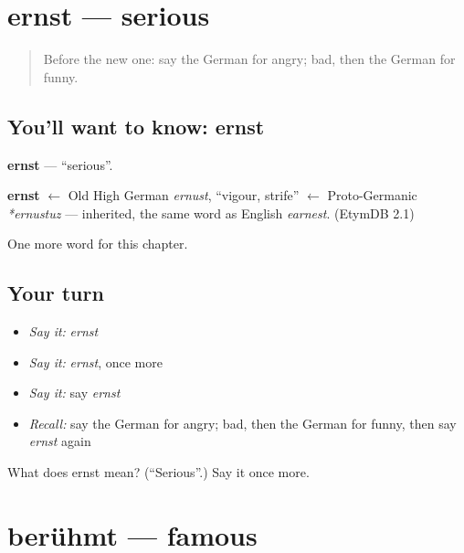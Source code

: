 \section[ernst]{ernst — serious}

\label{lesson:GE-C133-ernst}



\begin{quote}
Before the new one: say the German for angry; bad, then the German for funny.
\end{quote}

\subsection*{You'll want to know: ernst}
\textbf{ernst} — \textquotedblleft{}serious\textquotedblright{}.

\begin{cousinweb}
\textbf{ernst} $\leftarrow$ Old High German \emph{ernust}, \textquotedblleft{}vigour, strife\textquotedblright{} $\leftarrow$ Proto-Germanic \emph{*ernustuz} — inherited, the same word as English \emph{earnest}. (EtymDB 2.1)
\end{cousinweb}

\begin{grammarlens}[title={What you've built}]
One more word for this chapter.
\end{grammarlens}

\subsection*{Your turn}
\begin{itemize}
\raggedright
  \item \emph{Say it:} \emph{ernst}
  \item \emph{Say it:} \emph{ernst}, once more
  \item \emph{Say it:} say \emph{ernst}
  \item \emph{Recall:} say the German for angry; bad, then the German for funny, then say \emph{ernst} again
\end{itemize}

\begin{tcolorbox}[breakable,colback=teal!4,colframe=teal!35!black,title={Before you move on}]
What does ernst mean? (\textquotedblleft{}Serious\textquotedblright{}.) Say it once more.
\end{tcolorbox}
\section[berühmt]{berühmt — famous}

